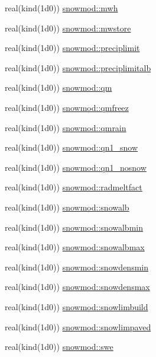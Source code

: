 \begin{DoxyCompactItemize}
real(kind(1d0)) \hyperlink{namespacesnowmod_a7e8123e5b32bedfb676ea5c6ca62272a}{snowmod\+::mwh}
\item 
real(kind(1d0)) \hyperlink{namespacesnowmod_affe56e4e5f1d5df5d7f4bbae7ae22541}{snowmod\+::mwstore}
\item 
real(kind(1d0)) \hyperlink{namespacesnowmod_a9e24791cb966600bc8e20739bc1f36b3}{snowmod\+::preciplimit}
\item 
real(kind(1d0)) \hyperlink{namespacesnowmod_a5dcda7794eeea3753a3f14cd6fdf47b8}{snowmod\+::preciplimitalb}
\item 
real(kind(1d0)) \hyperlink{namespacesnowmod_a1d7e7d0b8974783e0320cde393e09594}{snowmod\+::qm}
\item 
real(kind(1d0)) \hyperlink{namespacesnowmod_adbb58215814d438f2486f880958737be}{snowmod\+::qmfreez}
\item 
real(kind(1d0)) \hyperlink{namespacesnowmod_a35fe883b6ebd9767f44c27354160afd3}{snowmod\+::qmrain}
\item 
real(kind(1d0)) \hyperlink{namespacesnowmod_ad0e97f4f3c91c80ab519eab77750a5c0}{snowmod\+::qn1\+\_\+snow}
\item 
real(kind(1d0)) \hyperlink{namespacesnowmod_adfca55100f9a2262f228ea1e39d61271}{snowmod\+::qn1\+\_\+nosnow}
\item 
real(kind(1d0)) \hyperlink{namespacesnowmod_abb043edcfd004e81969e16e07ed0d646}{snowmod\+::radmeltfact}
\item 
real(kind(1d0)) \hyperlink{namespacesnowmod_a269fc9eb4dcd8dc77888c370c046a3c2}{snowmod\+::snowalb}
\item 
real(kind(1d0)) \hyperlink{namespacesnowmod_a96e2ce7900b7310542876993d72547ef}{snowmod\+::snowalbmin}
\item 
real(kind(1d0)) \hyperlink{namespacesnowmod_abce33f4b342130e8ac52ef51369bc801}{snowmod\+::snowalbmax}
\item 
real(kind(1d0)) \hyperlink{namespacesnowmod_a4b6de2a8e2186c8f314bbbfe6e78d345}{snowmod\+::snowdensmin}
\item 
real(kind(1d0)) \hyperlink{namespacesnowmod_a8a8b8429973d4227f3f1af64ebce2e79}{snowmod\+::snowdensmax}
\item 
real(kind(1d0)) \hyperlink{namespacesnowmod_a0462c0f187d9c6a590598f728f776991}{snowmod\+::snowlimbuild}
\item 
real(kind(1d0)) \hyperlink{namespacesnowmod_a7e327a63642bd081c76b33340881ae7b}{snowmod\+::snowlimpaved}
\item 
real(kind(1d0)) \hyperlink{namespacesnowmod_a216f7ed83c0474b708443eddfa6c574e}{snowmod\+::swe}

\end{DoxyCompactItemize}
